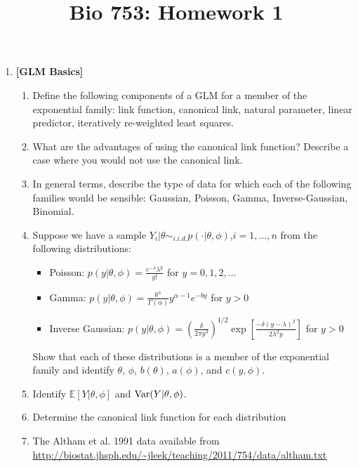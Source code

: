 \documentclass[12pt]{article}
\title{Bio 753: Homework 1}
\newcommand{\e}{\mathbb{E}}
\begin{document}
\maketitle
{}

\begin{enumerate}
\item \textbf{[GLM Basics]}

\begin{enumerate}
\item Define the following components of a GLM for a member of the exponential family: link function, canonical link, natural parameter, linear predictor, iteratively re-weighted least squares. 
\item What are the advantages of using the canonical link function? Describe a case where you would not use the canonical link. 
\item In general terms, describe the type of data for which each of the following families would be sensible: Gaussian, Poisson, Gamma, Inverse-Gaussian, Binomial. 
\item Suppose we have a sample $Y_i|\theta \sim_{i.i.d.} p(\cdot | \theta,\phi)$,$i=1,\ldots,n$ from the following distributions: 
\begin{itemize}
\item Poisson: $p(y | \theta,\phi) = \frac{e^{-\lambda} \lambda^y}{y!}$ for $y=0,1,2,\ldots$
\item Gamma: $p(y| \theta,\phi) = \frac{b^{\alpha}}{\Gamma(\alpha)}y^{\alpha-1}e^{-by}$ for $y > 0$
\item Inverse Gaussian: $p(y | \theta, \phi) = \left(\frac{\delta}{2\pi y^3}\right)^{1/2} \exp\left[\frac{-\delta(y-\lambda)^2}{2\lambda^2y}\right]$ for $y > 0$
\end{itemize}
Show that each of these distributions is a member of the exponential family and identify $\theta$, $\phi$, $b(\theta)$, $a(\phi)$, and $c(y,\phi)$. 
\item Identify $\e[Y|\theta,\phi]$ and ${\rm Var}(Y | \theta,\phi)$. 
\item Determine the canonical link function for each distribution
\item The Altham et al. 1991 data available from \url{http://biostat.jhsph.edu/~jleek/teaching/2011/754/data/altham.txt}


\end{enumerate}
\end{enumerate}
\end{document}
